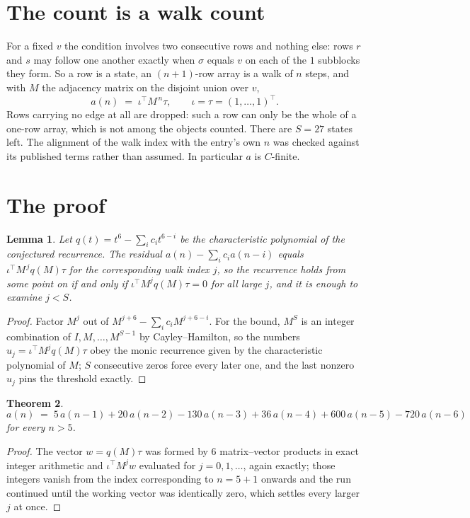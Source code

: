 \documentclass[11pt,a4paper]{article}
\theoremstyle{plain}
\newtheorem{theorem}{Theorem}
\newtheorem{lemma}[theorem]{Lemma}
\theoremstyle{definition}
\begin{document}
\section{The count is a walk count}

For a fixed $v$ the condition involves two consecutive rows and nothing
else: rows $r$ and $s$ may follow one another exactly when $\sigma$ equals $v$ on each of the
$1$ subblocks they form. So a row is a state, an $(n+1)$-row array is a walk of $n$
steps, and with $M$ the adjacency matrix on the disjoint union over $v$,
\[
a(n)\;=\;\iota^{\!\top}M^{\,n}\tau,\qquad\iota=\tau=(1,\dots,1)^{\!\top} .
\]
Rows carrying no edge at all are dropped: such a row can only be the whole of a one-row
array, which is not among the objects counted. There are $S=27$ states left.
The alignment of the walk index with the entry's own $n$ was checked against its published
terms rather than assumed. In particular $a$ is $C$-finite.

\section{The proof}

\begin{lemma}\label{lem:crit}
Let $q(t)=t^{6}-\sum_i c_it^{6-i}$ be the characteristic polynomial of the
conjectured recurrence. The residual $a(n)-\sum_ic_ia(n-i)$ equals
$\iota^{\!\top}M^{\,j}q(M)\tau$ for the corresponding walk index $j$, so the recurrence
holds from some point on if and only if $\iota^{\!\top}M^{j}q(M)\tau=0$ for all large $j$,
and it is enough to examine $j<S$.
\end{lemma}

\begin{proof}
Factor $M^{j}$ out of $M^{j+6}-\sum_ic_iM^{j+6-i}$. For the bound, $M^{S}$
is an integer combination of $I,M,\dots,M^{S-1}$ by Cayley--Hamilton, so the numbers
$u_j=\iota^{\!\top}M^{j}q(M)\tau$ obey the monic recurrence given by the characteristic
polynomial of $M$; $S$ consecutive zeros force every later one, and the last nonzero $u_j$
pins the threshold exactly.
\end{proof}

\begin{theorem}
\[
a(n)\;=\;5\,a(n-1) + 20\,a(n-2) - 130\,a(n-3) + 36\,a(n-4) + 600\,a(n-5) - 720\,a(n-6)
\]
for every $n>5$.
\end{theorem}

\begin{proof}
The vector $w=q(M)\tau$ was formed by $6$ matrix--vector products in exact integer
arithmetic and $\iota^{\!\top}M^{j}w$ evaluated for $j=0,1,\dots$, again exactly; those
integers vanish from the index corresponding to $n=5+1$ onwards and the run continued
until the working vector was identically zero, which settles every larger $j$ at once.
\end{proof}
\end{document}
